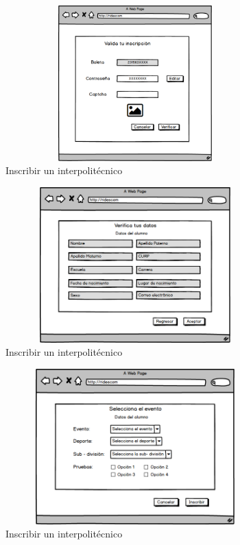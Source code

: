 		\begin{figure}[hbt!]
			\centering
			\includegraphics[width=10cm, height=6cm]{Imagenes/Disenos/p15InscripcionInterpolitecnico1.png}
			\caption{Inscribir un interpolitécnico}
			\label{Inscripcioninterpolitecnico}
		\end{figure}
	
		\begin{figure}[hbt!]
			\centering
			\includegraphics[width=10cm, height=6cm]{Imagenes/Disenos/p16InscripcionInterpolitecnico2.png}
			\caption{Inscribir un interpolitécnico}
			\label{Inscripcioninterpolitecnico2}
		\end{figure}
	
		\begin{figure}[hbt!]
			\centering
			\includegraphics[width=10cm, height=6cm]{Imagenes/Disenos/p17InscripcionInterpolitecnico3.png}
			\caption{Inscribir un interpolitécnico}
			\label{Inscripcioninterpolitecnico3}
		\end{figure}
			\pagebreak
	
